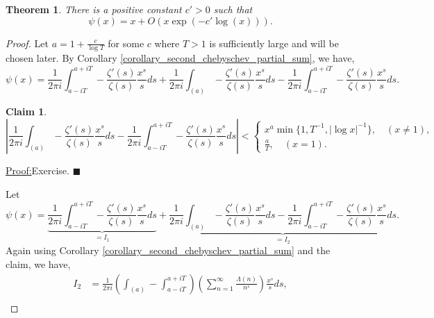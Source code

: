 \documentclass{article}
\newtheorem{theorem}{Theorem} [section]
\newtheorem{claim}{Claim}
\newenvironment{claimproof}[1]{\par\noindent\underline{Proof:}\space#1}{\hfill $\blacksquare$}
\begin{document}
  \begin{theorem}
    There is a positive constant $c'>0$ such that 
    \begin{equation*}
      \psi(x) = x+O(x\exp(-c'\log(x))).
    \end{equation*}
  \end{theorem}
\setcounter{claim}{0}
  \begin{proof}
    Let $a = 1+{\frac c {\log T}}$ for some $c$ where $T>1$ is sufficiently large and will be chosen later. By Corollary \ref{corollary_second_chebyschev_partial_sum}, we have,
    \begin{equation*}
      \psi(x) = {\frac 1 {2\pi i}}\int_{a-iT}^{a+iT}-{\frac {\zeta'(s)} {\zeta(s)}}{\frac {x^s} s}ds + {\frac 1 {2\pi i}}\int_{(a)}-{\frac {\zeta'(s)} {\zeta(s)}}{\frac {x^s} s}ds- {\frac 1 {2\pi i}}\int_{a-iT}^{a+iT}-{\frac {\zeta'(s)} {\zeta(s)}}{\frac {x^s} s}ds.
    \end{equation*}
    \begin{claim}
     \begin{equation*}
       \left\vert{\frac 1 {2\pi i}}\int_{(a)}-{\frac {\zeta'(s)} {\zeta(s)}}{\frac {x^s} s}ds- {\frac 1 {2\pi i}}\int_{a-iT}^{a+iT}-{\frac {\zeta'(s)} {\zeta(s)}}{\frac {x^s} s}ds\right\vert<\begin{cases}
        x^a\min\{1,T^{-1},\vert\log x\vert^{-1}\},\quad(x\not=1),\\
        {\frac a T},\quad(x=1).
       \end{cases}
     \end{equation*}
    \end{claim}
    \begin{claimproof}
    Exercise.
    \end{claimproof}
    \par Let 
    \begin{equation*}
      \psi(x) = \underbrace{{\frac 1 {2\pi i}}\int_{a-iT}^{a+iT}-{\frac {\zeta'(s)} {\zeta(s)}}{\frac {x^s} s}ds}_{=I_1} + \underbrace{{\frac 1 {2\pi i}}\int_{(a)}-{\frac {\zeta'(s)} {\zeta(s)}}{\frac {x^s} s}ds- {\frac 1 {2\pi i}}\int_{a-iT}^{a+iT}-{\frac {\zeta'(s)} {\zeta(s)}}{\frac {x^s} s}ds}_{=I_2}.
    \end{equation*}
    Again using Corollary \ref{corollary_second_chebyschev_partial_sum} and the claim, we have,
    \begin{align*}
      I_2 & = {\frac 1 {2\pi i}}\left(\int_{(a)}-\int_{a-iT}^{a+iT}\right)\left(\sum_{n=1}^\infty{\frac {\Lambda(n)} {n^s}}\right){\frac {x^s} s}ds,\\

\end{align*}
\end{proof}
\end{document}
